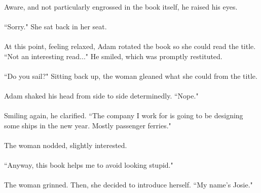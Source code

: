 \documentclass{article}
\begin{document}
\paragraph{}
Aware, and not particularly engrossed in the book itself, he raised his eyes.

\paragraph{}
``Sorry." She sat back in her seat.

\paragraph{}
At this point, feeling relaxed, Adam rotated the book so she could read the title. ``Not an interesting read..." He smiled, which was promptly restituted.

\paragraph{}
``Do you sail?" Sitting back up, the woman gleaned what she could from the title.

\paragraph{}
Adam shaked his head from side to side determinedly. ``Nope."

\paragraph{}
Smiling again, he clarified. ``The company I work for is going to be designing some ships in the new year. Mostly passenger ferries."

\paragraph{}
The woman nodded, slightly interested.

\paragraph{}
``Anyway, this book helps me to avoid looking stupid."

\paragraph{}
The woman grinned. Then, she decided to introduce herself. ``My name's Josie."
\end{document}
